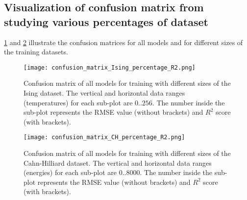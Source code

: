 \documentclass[11pt, authoryear]{elsarticle}
\begin{document}
\begin{appendix}
		
		\section{Visualization of confusion matrix from studying various percentages of dataset}
		\label{app:MuChaCNN}
		\label{appendix:confusion_percentage}
		\cref{fig:ising_confusion_percentage} and \cref{fig:ch_confusion_percentage} illustrate the confusion matrices for all models and for different sizes
		of the training datasets. 
		\begin{figure}
			\centering
			\texttt{[image: confusion\_matrix\_Ising\_percentage\_R2.png]}
			\caption[]{
				Confusion matrix of all models for training with different 
				sizes of the Ising dataset. The vertical and horizontal data ranges 
				(temperatures) for each sub-plot are $0..256$. The number inside the sub-plot represents the RMSE value (without brackets) and $R^2$ score (with brackets).}	
			\label{fig:ising_confusion_percentage}
		\end{figure}
		
		\begin{figure}
			\centering
			\texttt{[image: confusion\_matrix\_CH\_percentage\_R2.png]}
			\caption[]{Confusion matrix of all models for training with 
				different sizes of the Cahn-Hilliard dataset. The vertical and 
				horizontal data ranges (energies) for each sub-plot are $0..8000$.
				The number inside the sub-plot represents the RMSE value (without brackets) and $R^2$ score (with brackets).}	
			\label{fig:ch_confusion_percentage}
		\end{figure}
		

\end{appendix}
\end{document}
